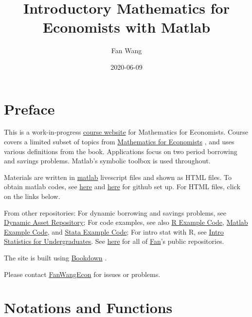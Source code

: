 \documentclass[
]{book}
\title{Introductory Mathematics for Economists with Matlab}
\author{Fan Wang}
\date{2020-06-09}
\begin{document}
\maketitle

{
\hypersetup{linkcolor=}
\setcounter{tocdepth}{1}
\tableofcontents
}
\hypertarget{preface}{%
\chapter*{Preface}\label{preface}}

This is a work-in-progress \href{https://fanwangecon.github.io/Math4Econ/}{course website} for Mathematics for Economists. Course covers a limited subset of topics from \href{Mathematics\%20for\%20Economists}{Mathematics for Economists} \citep{simonblume1994}, and uses various definitions from the book. Applications focus on two period borrowing and savings problems. Matlab's symbolic toolbox is used throughout.

Materials are written in \href{https://www.mathworks.com/products/matlab.html}{matlab} \citep{matlab} livescript files and shown as HTML files. To obtain matlab codes, see \href{docs/gitsetup.md}{here} and \href{docs/gitsetupown.md}{here} for github set up. For HTML files, click on the links below.

From other repositories: For dynamic borrowing and savings problems, see \href{https://fanwangecon.github.io/CodeDynaAsset/}{Dynamic Asset Repository}; For code examples, see also \href{https://fanwangecon.github.io/R4Econ/}{R Example Code}, \href{https://fanwangecon.github.io/M4Econ/}{Matlab Example Code}, and \href{https://fanwangecon.github.io/Stata4Econ/}{Stata Example Code}; For intro stat with R, see \href{https://fanwangecon.github.io/Stat4Econ/}{Intro Statistics for Undergraduates}. See \href{https://github.com/FanWangEcon}{here} for all of \href{https://fanwangecon.github.io/}{Fan}'s public repositories.

The site is built using \href{https://bookdown.org/}{Bookdown} \citep{R-bookdown}.

Please contact \href{https://fanwangecon.github.io/}{FanWangEcon} for issues or problems.

\hypertarget{notations-and-functions}{%
\chapter{Notations and Functions}\label{notations-and-functions}}
\end{document}
